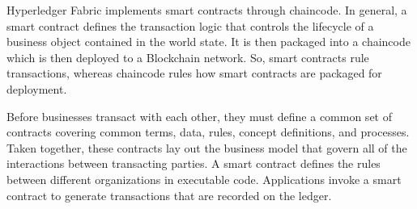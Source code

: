 Hyperledger Fabric implements smart contracts through chaincode. In general, a smart contract defines the transaction logic that controls the lifecycle of a business object contained in the world state. It is then packaged into a chaincode which is then deployed to a Blockchain network. So, smart contracts rule transactions, whereas chaincode rules how smart contracts are packaged for deployment.

Before businesses transact with each other, they must define a common set of contracts covering common terms, data, rules, concept definitions, and processes. Taken together, these contracts lay out the business model that govern all of the interactions between transacting parties. A smart contract defines the rules between different organizations in executable code. Applications invoke a smart contract to generate transactions that are recorded on the ledger.

